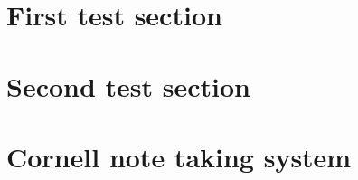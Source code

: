 \documentclass[a4paper,12pt]{article}  %
\begin{document}


\tableofcontents
\newpage

\todototoc\listoftodos

\section{First test section}
  

\section{Second test section}
  

\section{Cornell note taking system}
  

\listoftables
\listoffigures

\printbibliography[
heading=bibintoc,
title={Список литературы}
]
\end{document}
